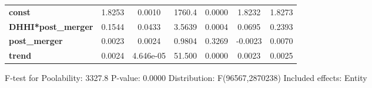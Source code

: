 \documentclass{report}
\begin{document}
\begin{center}
\begin{tabular}{lcccccc}
\midrule
\textbf{const}             &       1.8253       &       0.0010       &      1760.4     &      0.0000      &       1.8232      &       1.8273       \\
\textbf{DHHI*post\_merger} &       0.1544       &       0.0433       &      3.5639     &      0.0004      &       0.0695      &       0.2393       \\
\textbf{post\_merger}      &       0.0023       &       0.0024       &      0.9804     &      0.3269      &      -0.0023      &       0.0070       \\
\textbf{trend}             &       0.0024       &     4.646e-05      &      51.500     &      0.0000      &       0.0023      &       0.0025       \\
\bottomrule
\end{tabular}
\end{center}

F-test for Poolability: 3327.8 \newline
 P-value: 0.0000 \newline
 Distribution: F(96567,2870238) \newline
  \newline
 Included effects: Entity
\end{document}
